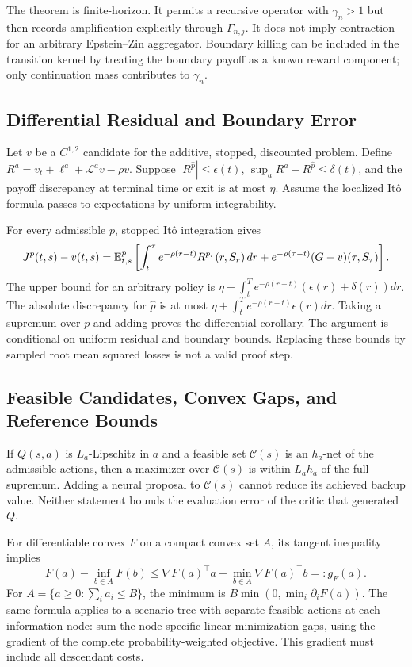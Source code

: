 The theorem is finite-horizon. It permits a recursive operator with $\gamma_n>1$ but then records amplification explicitly through $\Gamma_{n,j}$. It does not imply contraction for an arbitrary Epstein--Zin aggregator. Boundary killing can be included in the transition kernel by treating the boundary payoff as a known reward component; only continuation mass contributes to $\gamma_n$.

\subsection{Differential Residual and Boundary Error}
Let $v$ be a $C^{1,2}$ candidate for the additive, stopped, discounted problem. Define $R^a=v_t+\ell^a+\mathcal L^av-\rho v$. Suppose $|R^{\hat p}|\leq\epsilon(t)$, $\sup_a R^a-R^{\hat p}\leq\delta(t)$, and the payoff discrepancy at terminal time or exit is at most $\eta$. Assume the localized It\^o formula passes to expectations by uniform integrability.

For every admissible $p$, stopped It\^o integration gives
\[
 J^p(t,s)-v(t,s)=\mathbb E_{t,s}^p\left[\int_t^\tau e^{-\rho(r-t)}R^{p_r}(r,S_r)\,dr
 +e^{-\rho(\tau-t)}(G-v)(\tau,S_\tau)\right].
\]
The upper bound for an arbitrary policy is $\eta+\int_t^T e^{-\rho(r-t)}(\epsilon(r)+\delta(r))dr$. The absolute discrepancy for $\hat p$ is at most $\eta+\int_t^T e^{-\rho(r-t)}\epsilon(r)dr$. Taking a supremum over $p$ and adding proves the differential corollary. The argument is conditional on uniform residual and boundary bounds. Replacing these bounds by sampled root mean squared losses is not a valid proof step.

\subsection{Feasible Candidates, Convex Gaps, and Reference Bounds}
If $Q(s,a)$ is $L_a$-Lipschitz in $a$ and a feasible set $\mathcal C(s)$ is an $h_a$-net of the admissible actions, then a maximizer over $\mathcal C(s)$ is within $L_ah_a$ of the full supremum. Adding a neural proposal to $\mathcal C(s)$ cannot reduce its achieved backup value. Neither statement bounds the evaluation error of the critic that generated $Q$.

For differentiable convex $F$ on a compact convex set $A$, its tangent inequality implies
\[
 F(a)-\inf_{b\in A}F(b)\leq\nabla F(a)^\top a-\min_{b\in A}\nabla F(a)^\top b=:g_F(a).
\]
For $A=\{a\geq0:\sum_i a_i\leq B\}$, the minimum is $B\min(0,\min_i\partial_iF(a))$. The same formula applies to a scenario tree with separate feasible actions at each information node: sum the node-specific linear minimization gaps, using the gradient of the complete probability-weighted objective. This gradient must include all descendant costs.

